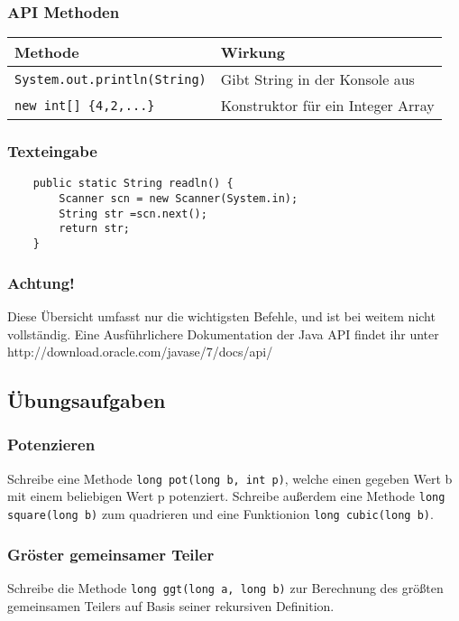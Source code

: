 		\subsubsection{API Methoden}
		\begin{tabular}{ll}
		\textbf{Methode} & \textbf{Wirkung}\\
		\hline
		\lstinline$System.out.println(String)$ & Gibt String in der Konsole aus\\
		\lstinline$new int[] {4,2,...}$ & Konstruktor für ein Integer Array\\		
		
		\end{tabular}

		\subsubsection{Texteingabe}
			\begin{lstlisting}
	public static String readln() {	
		Scanner scn = new Scanner(System.in);
		String str =scn.next();
		return str;
	}
			\end{lstlisting}

		\subsubsection{Achtung!}
			Diese Übersicht umfasst nur die wichtigsten Befehle, und ist bei weitem nicht vollständig. Eine Ausführlichere Dokumentation der Java API findet ihr unter http://download.oracle.com/javase/7/docs/api/

	\subsection{Übungsaufgaben}
		\subsubsection{Potenzieren}
			Schreibe eine Methode \lstinline$long pot(long b, int p)$, welche einen gegeben Wert b mit einem beliebigen Wert p potenziert. Schreibe außerdem eine Methode \lstinline$long square(long b)$ zum quadrieren und eine Funktionion \lstinline$long cubic(long b)$.
		\subsubsection{Gröster gemeinsamer Teiler}
			Schreibe die Methode \lstinline$long ggt(long a, long b)$ zur Berechnung des größten gemeinsamen Teilers auf Basis seiner rekursiven Definition.
